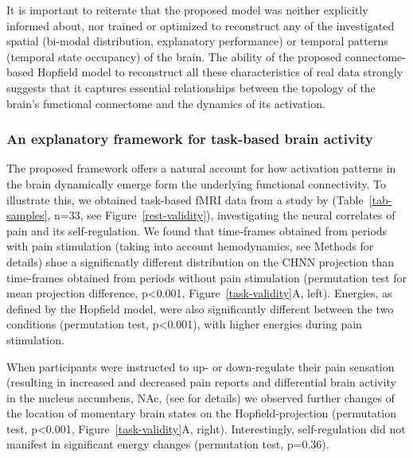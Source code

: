\documentclass{article}
\begin{document}
It is important to reiterate that the proposed model was neither explicitly informed about, nor trained or optimized to reconstruct any of the investigated spatial (bi-modal distribution, explanatory performance) or temporal patterns (temporal state occupancy) of the brain.
The ability of the proposed connectome-based Hopfield model to reconstruct all these characteristics of real data strongly suggests that it captures essential relationships between the topology of the brain's functional connectome and the dynamics of its activation.

\subsubsection{An explanatory framework for task-based brain activity}\label{An explanatory framework for task-based brain activity}

The proposed framework offers a natural account for how activation patterns in the brain dynamically emerge form the
underlying functional connectivity. To illustrate this, we obtained task-based fMRI data from a study by
\citet{woo2015distinct} (Table~\ref{tab-samples}, n=33, see Figure~\ref{rest-validity}), investigating the neural
correlates of pain and its self-regulation. We found that time-frames obtained from periods with pain stimulation
(taking into account hemodynamics, see Methods for details) shoe a significnatly different distribution on the CHNN projection
than time-frames obtained from periods without pain stimulation (permutation test for mean projection difference, p\textless 0.001, Figure~\ref{task-validity}A, left). Energies, as defined by the Hopfield model, were also significantly different between the two conditions
(permutation test, p\textless 0.001), with higher energies during pain stimulation.

When participants were instructed to up- or down-regulate their pain sensation (resulting in increased and decreased
pain reports and differential brain activity in the nucleus accumbens, NAc, (see \citep{woo2015distinct} for details)
we observed further changes of the location of momentary brain states on the Hopfield-projection (permutation test,
p\textless 0.001, Figure~\ref{task-validity}A, right). Interestingly, self-regulation did not manifest in significant energy changes
(permutation test, p=0.36).
\end{document}
